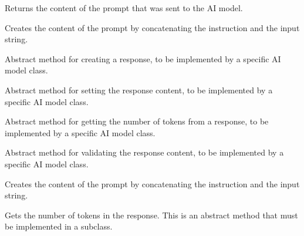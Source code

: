 \documentclass[letterpaper,10pt,english]{sphinxmanual}
\begin{document}
\begin{fulllineitems}
\begin{description}
\sphinxAtStartPar
Returns the content of the prompt that was sent to the AI model.

\sphinxAtStartPar
Creates the content of the prompt by concatenating the instruction and the input string.

\sphinxAtStartPar
Abstract method for creating a response, to be implemented by a specific AI model class.

\sphinxAtStartPar
Abstract method for setting the response content, to be implemented by a specific AI model class.

\sphinxAtStartPar
Abstract method for getting the number of tokens from a response,
to be implemented by a specific AI model class.

\sphinxAtStartPar
Abstract method for validating the response content, to be implemented by a specific AI model class.

\end{description}

\begin{fulllineitems}
\label{\detokenize{main.ai_language_model:main.ai_language_model.ai_language_model.AILanguageModel.create_prompt_content}}
\pysigstartsignatures
{}
\pysigstopsignatures
\sphinxAtStartPar
Creates the content of the prompt by concatenating the instruction and the input string.

\end{fulllineitems}


\begin{fulllineitems}
\label{\detokenize{main.ai_language_model:main.ai_language_model.ai_language_model.AILanguageModel.get_num_tokens_from_response}}
\pysigstartsignatures
{}
\pysigstopsignatures
\sphinxAtStartPar
Gets the number of tokens in the response. This is an abstract method that must be implemented in a subclass.



\end{fulllineitems}
\end{fulllineitems}
\end{document}
